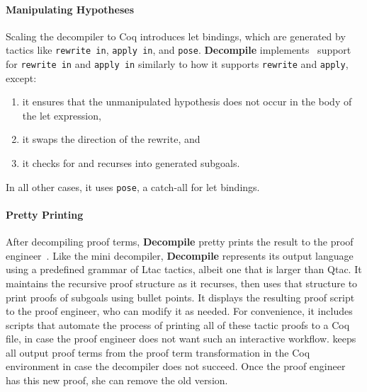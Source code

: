 \paragraph{Manipulating Hypotheses}
Scaling the decompiler to Coq introduces let bindings, which are generated by 
tactics like \lstinline{rewrite in}, \lstinline{apply in}, and \lstinline{pose}.
\textbf{Decompile} implements~ %
support for \lstinline{rewrite in} and \lstinline{apply in} similarly to how it supports
\lstinline{rewrite} and \lstinline{apply}, except:

\begin{enumerate}
\item it ensures that the unmanipulated hypothesis does not occur in the body of the let expression,
\item it swaps the direction of the rewrite, and
\item it checks for and recurses into generated subgoals.
\end{enumerate}
In all other cases, it uses \lstinline{pose}, a catch-all for let bindings.

\paragraph{Pretty Printing}
After decompiling proof terms, \textbf{Decompile} pretty prints the result to the proof engineer~.
Like the mini decompiler, \textbf{Decompile} represents its output language using a predefined grammar of Ltac tactics,
albeit one that is larger than Qtac.
It maintains the recursive proof structure as it recurses, then uses that structure to print proofs of subgoals using bullet points.
It displays the resulting proof script to the proof engineer, who can modify it as needed.
For convenience, it includes scripts that automate the process of printing all of these tactic proofs to a Coq file,
in case the proof engineer does not want such an interactive workflow.
\toolname keeps all output proof terms from the proof term transformation in the Coq environment in case the decompiler does not succeed.
Once the proof engineer has this new proof, she can remove the old version.


